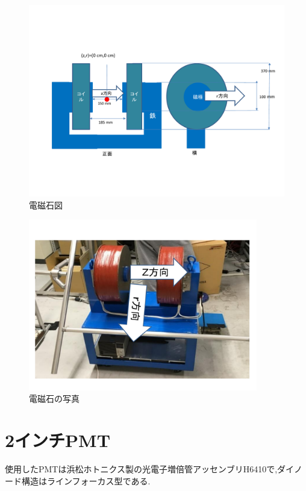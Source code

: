 \begin{figure}[h]
	\centering
	\includegraphics[width=15cm]{fig/iguchi/magnetfigure.pdf}
	\caption{電磁石図}
	\label{magfigure}
\end{figure}

\begin{figure}[h]
	\centering
	\includegraphics[width=10cm]{fig/iguchi/magnetphoto.pdf}
	\caption{電磁石の写真}
	\label{magphoto}
\end{figure}




\section{2インチPMT}


使用したPMTは浜松ホトニクス製の光電子増倍管アッセンブリH6410で,ダイノード構造はラインフォーカス型である.\cite{pmtH6410}

